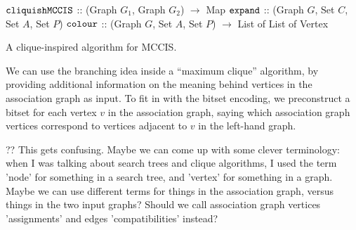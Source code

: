 \documentclass{llncs}
\begin{document}
\begin{algorithm}[tb] \DontPrintSemicolon
\nl $\FuncSty{cliquishMCCIS}$ :: (Graph $G_1$, Graph $G_2$) $\rightarrow$ Map \;
\nl {}
\vspace{1ex}
\nl $\FuncSty{expand}$ :: (Graph $G$, Set $C$, Set $A$, Set $P$) \;
\nl {}
\vspace{1ex}
\nl $\FuncSty{colour}$ :: (Graph $G$, Set $A$, Set $P$) $\rightarrow$ List of List of Vertex \;
\nl {}
\caption{A clique-inspired algorithm for MCCIS.}
\label{algorithm:mc}
\end{algorithm}

We can use the branching idea inside a ``maximum clique'' algorithm, by providing additional
information on the meaning behind vertices in the association graph as input. To fit in with the
bitset encoding, we preconstruct a bitset for each vertex $v$ in the association graph, saying which
association graph vertices correspond to vertices adjacent to $v$ in the left-hand graph.

?? This gets confusing. Maybe we can come up with some clever terminology: when I was talking about
search trees and clique algorithms, I used the term 'node' for something in a search tree, and
'vertex' for something in a graph. Maybe we can use different terms for things in the association
graph, versus things in the two input graphs? Should we call association graph vertices
'assignments' and edges 'compatibilities' instead?
\end{document}
